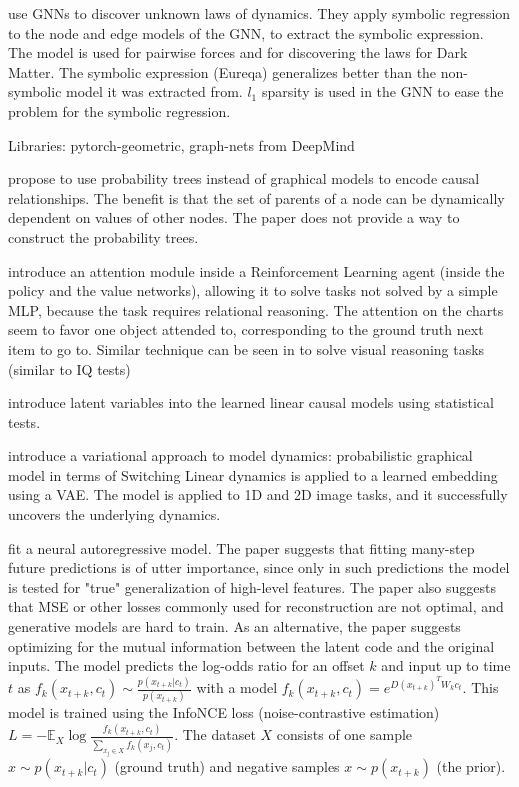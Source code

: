 \documentclass[a4paper,11pt,oneside]{report}
\begin{document}
\cite{Cranmer2020} use GNNs to discover unknown laws of dynamics. They apply symbolic regression to the node and edge models of the GNN, to extract the symbolic expression. The model is used for pairwise forces and for discovering the laws for Dark Matter. The symbolic expression (Eureqa) generalizes better than the non-symbolic model it was extracted from. $l_1$ sparsity is used in the GNN to ease the problem for the symbolic regression.

Libraries: pytorch-geometric, graph-nets from DeepMind

\cite{Genewein} propose to use probability trees instead of graphical models to encode causal relationships. The benefit is that the set of parents of a node can be dynamically dependent on values of other nodes. The paper does not provide a way to construct the probability trees.

\cite{Zambaldi2018} introduce an attention module inside a Reinforcement Learning agent (inside the policy and the value networks), allowing it to solve tasks not solved by a simple MLP, because the task requires relational reasoning. The attention on the charts seem to favor one object attended to, corresponding to the ground truth next item to go to. Similar technique can be seen in \cite{Hahne2019} to solve visual reasoning tasks (similar to IQ tests)

\cite{Xie2020} introduce latent variables into the learned linear causal models using statistical tests.

\cite{Johnson2016} introduce a variational approach to model dynamics: probabilistic graphical model in terms of Switching Linear dynamics is applied to a learned embedding using a VAE. The model is applied to 1D and 2D image tasks, and it successfully uncovers the underlying dynamics.

\cite{VanDenOord2018} fit a neural autoregressive model. The paper suggests that fitting many-step future predictions is of utter importance, since only in such predictions the model is tested for "true" generalization of high-level features. The paper also suggests that MSE or other losses commonly used for reconstruction are not optimal, and generative models are hard to train. As an alternative, the paper suggests optimizing for the mutual information between the latent code and the original inputs. The model predicts the log-odds ratio for an offset $k$ and input up to time $t$ as $f_k(x_{t+k},c_t)\sim \frac{p(x_{t+k}|c_t)}{p(x_{t+k})}$ with a model $f_k(x_{t+k}, c_t)=e^{D(x_{t+k})^TW_kc_t}$. This model is trained using the InfoNCE loss (noise-contrastive estimation) $L=-\mathbb E_X\log\frac{f_k(x_{t+k}, c_t)}{\sum_{x_j\in X}f_k(x_j,c_t)}$. The dataset $X$ consists of one sample $x\sim p(x_{t+k}|c_t)$ (ground truth) and negative samples $x\sim p(x_{t+k})$ (the prior).
\end{document}

